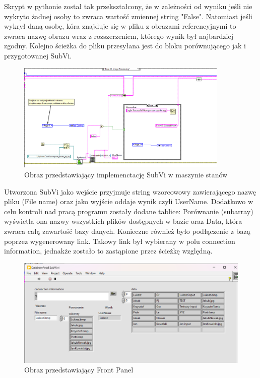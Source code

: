 \documentclass{report}
\begin{document}
Skrypt w pythonie został tak przekształcony, że w zależności od wyniku jeśli nie wykryto żadnej osoby to zwraca wartość zmiennej string "False".
Natomiast jeśli wykrył daną osobę, kóra znajduje się w pliku z obrazami referencyjnymi to zwraca nazwę obrazu wraz z rozszerzeniem, którego wynik był najbardziej zgodny.
Kolejno ścieżka do pliku przesyłana jest do bloku porównującego jak i przygotowanej SubVi.

\begin{figure}[H]
    \centering
    \includegraphics[width=0.9\textwidth]{src/Database/Database_read.png}
    \caption{Obraz przedstawiający implemenctację SubVi w maszynie stanów}
    \label{fig:first-att}
\end{figure}

Utworzona SubVi jako wejście przyjmuje string wzorcowowy zawierającego nazwę pliku (File name) oraz jako wyjście oddaje wynik czyli UserName.
Dodatkowo w celu kontroli nad pracą programu zostały dodane tablice: Porównanie (subarray) wyświetla ona nazwy wszystkich plików dostępnych w bazie oraz Data, która zwraca
całą zawartość bazy danych. Konieczne również było podłączenie z bazą poprzez wygenerowany link. Takowy link był wybierany w polu connection information, 
jednakże zostało to zastąpione przez ścieżkę względną.

\begin{figure}[H]
    \centering
    \includegraphics[width=1.0\textwidth]{src/Database/Database_read_subvi_frontpanel.png}
    \caption{Obraz przedstawiający Front Panel }
    \label{fig:first-att}
\end{figure}
\end{document}

